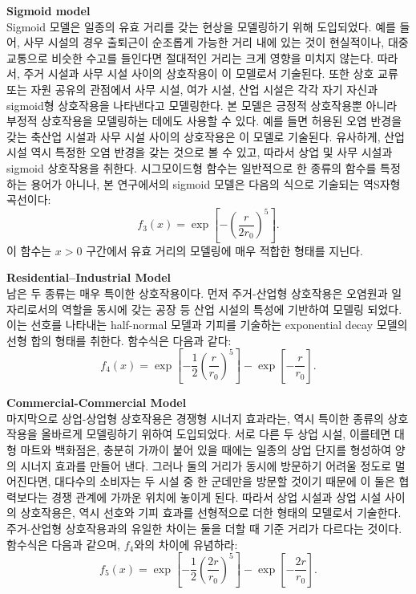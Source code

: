 \documentclass[10pt]{article}
\begin{document}
\begin{multicols}{2}
\textbf{Sigmoid model} \\
Sigmoid 모델은 일종의 유효 거리를 갖는 현상을 모델링하기 위해 도입되었다. 예를 들어, 사무 시설의 경우 출퇴근이 순조롭게 가능한 거리 내에 있는 것이 현실적이나, 대중교통으로 비슷한 수고를 들인다면 절대적인 거리는 크게 영향을 미치지 않는다. 따라서, 주거 시설과 사무 시설 사이의 상호작용이 이 모델로서 기술된다. 또한 상호 교류 또는 자원 공유의 관점에서 사무 시설, 여가 시설, 산업 시설은 각각 자기 자신과 sigmoid형 상호작용을 나타낸다고 모델링한다. 본 모델은 긍정적 상호작용뿐 아니라 부정적 상호작용을 모델링하는 데에도 사용할 수 있다. 예를 들면 허용된 오염 반경을 갖는 축산업 시설과 사무 시설 사이의 상호작용은 이 모델로 기술된다. 유사하게, 산업 시설 역시 특정한 오염 반경을 갖는 것으로 볼 수 있고, 따라서 상업 및 사무 시설과 sigmoid 상호작용을 취한다. 시그모이드형 함수는 일반적으로 한 종류의 함수를 특정하는 용어가 아니나, 본 연구에서의 sigmoid 모델은 다음의 식으로 기술되는 역S자형 곡선이다:
\begin{equation}
    f_3(x) = \exp \left[ - \left( \frac{r}{2r_0} \right)^5 \right].
\end{equation}
이 함수는 $x > 0$ 구간에서 유효 거리의 모델링에 매우 적합한 형태를 지닌다.

\textbf{Residential–Industrial Model} \\
남은 두 종류는 매우 특이한 상호작용이다. 먼저 주거-산업형 상호작용은 오염원과 일자리로서의 역할을 동시에 갖는 공장 등 산업 시설의 특성에 기반하여 모델링 되었다. 이는 선호를 나타내는 half-normal 모델과 기피를 기술하는 exponential decay 모델의 선형 합의 형태를 취한다. 함수식은 다음과 같다:
\begin{equation}
    f_4(x) = \exp \left[ - \frac{1}{2} \left( \frac{r}{r_0} \right)^5 \right] - \exp \left[ - \frac{r}{r_0} \right].
\end{equation}

\textbf{Commercial-Commercial Model} \\
마지막으로 상업-상업형 상호작용은 경쟁형 시너지 효과라는, 역시 특이한 종류의 상호작용을 올바르게 모델링하기 위하여 도입되었다. 서로 다른 두 상업 시설, 이를테면 대형 마트와 백화점은, 충분히 가까이 붙어 있을 때에는 일종의 상업 단지를 형성하여 양의 시너지 효과를 만들어 낸다. 그러나 둘의 거리가 동시에 방문하기 어려울 정도로 멀어진다면, 대다수의 소비자는 두 시설 중 한 군데만을 방문할 것이기 때문에 이 둘은 협력보다는 경쟁 관계에 가까운 위치에 놓이게 된다. 따라서 상업 시설과 상업 시설 사이의 상호작용은, 역시 선호와 기피 효과를 선형적으로 더한 형태의 모델로서 기술한다. 주거-산업형 상호작용과의 유일한 차이는 둘을 더할 때 기준 거리가 다르다는 것이다. 함수식은 다음과 같으며, $f_4$와의 차이에 유념하라:
\begin{equation}
    f_5(x) = \exp \left[ - \frac{1}{2} \left( \frac{2r}{r_0} \right)^5 \right] - \exp \left[ - \frac{2r}{r_0} \right].
\end{equation}


\end{multicols}
\end{document}
